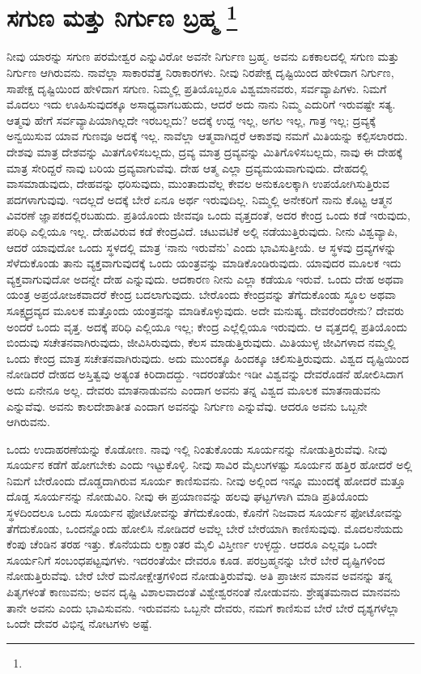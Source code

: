 
\chapter[ಸುಗುಣ ಮತ್ತು ನಿರ್ಗುಣ ಬ್ರಹ್ಮ ]{ಸಗುಣ ಮತ್ತು ನಿರ್ಗುಣ ಬ್ರಹ್ಮ \protect\footnote{}}

ನೀವು ಯಾರನ್ನು ಸಗುಣ ಪರಮೇಶ್ವರ ಎನ್ನುವಿರೋ ಅವನೇ ನಿರ್ಗುಣ ಬ್ರಹ್ಮ. ಅವನು ಏಕಕಾಲದಲ್ಲಿ ಸಗುಣ ಮತ್ತು ನಿರ್ಗುಣ ಆಗಿರುವನು. ನಾವೆಲ್ಲಾ ಸಾಕಾರವೆತ್ತ ನಿರಾಕಾರಗಳು. ನೀವು ನಿರಪೇಕ್ಷ ದೃಷ್ಟಿಯಿಂದ ಹೇಳಿದಾಗ ನಿರ್ಗುಣ, ಸಾಪೇಕ್ಷ ದೃಷ್ಟಿಯಿಂದ ಹೇಳಿದಾಗ ಸಗುಣ. ನಿಮ್ಮಲ್ಲಿ ಪ್ರತಿಯೊಬ್ಬರೂ ವಿಶ್ವಮಾನವರು, ಸರ್ವವ್ಯಾಪಿಗಳು. ನಿಮಗೆ ಮೊದಲು ಇದು ಊಹಿಸುವುದಕ್ಕೂ ಅಸಾಧ್ಯವಾಗಬಹುದು, ಆದರೆ ಅದು ನಾನು ನಿಮ್ಮ ಎದುರಿಗೆ ಇರುವಷ್ಟೇ ಸತ್ಯ. ಆತ್ಮವು ಹೇಗೆ ಸರ್ವವ್ಯಾಪಿಯಾಗಿಲ್ಲದೇ ಇರಬಲ್ಲದು? ಅದಕ್ಕೆ ಉದ್ದ ಇಲ್ಲ, ಅಗಲ ಇಲ್ಲ, ಗಾತ್ರ ಇಲ್ಲ; ದ್ರವ್ಯಕ್ಕೆ ಅನ್ವಯಿಸುವ ಯಾವ ಗುಣವೂ ಅದಕ್ಕೆ ಇಲ್ಲ. ನಾವೆಲ್ಲಾ ಆತ್ಮವಾಗಿದ್ದರೆ ಆಕಾಶವು ನಮಗೆ ಮಿತಿಯನ್ನು ಕಲ್ಪಿಸಲಾರದು. ದೇಶವು ಮಾತ್ರ ದೇಶವನ್ನು ಮಿತಗೊಳಿಸಬಲ್ಲದು, ದ್ರವ್ಯ ಮಾತ್ರ ದ್ರವ್ಯವನ್ನು ಮಿತಿಗೊಳಿಸಬಲ್ಲದು, ನಾವು ಈ ದೇಹಕ್ಕೆ ಮಾತ್ರ ಸೇರಿದ್ದರೆ ನಾವು ಬರಿಯ ದ್ರವ್ಯವಾಗುವೆವು. ದೇಹ ಆತ್ಮ ಎಲ್ಲಾ ದ್ರವ್ಯಮಯವಾಗುವುದು. ದೇಹದಲ್ಲಿ ವಾಸಮಾಡುವುದು, ದೇಹವನ್ನು ಧರಿಸುವುದು, ಮುಂತಾದುವೆಲ್ಲ ಕೇವಲ ಅನುಕೂಲಕ್ಕಾಗಿ ಉಪಯೋಗಿಸುತ್ತಿರುವ ಪದಗಳಾಗುವುವು. ಇದಲ್ಲದೆ ಅದಕ್ಕೆ ಬೇರೆ ಏನೂ ಅರ್ಥ ಇರುವುದಿಲ್ಲ. ನಿಮ್ಮಲ್ಲಿ ಅನೇಕರಿಗೆ ನಾನು ಕೊಟ್ಟ ಆತ್ಮನ ವಿವರಣೆ ಜ್ಞಾಪಕದಲ್ಲಿರಬಹುದು. ಪ್ರತಿಯೊಂದು ಜೀವವೂ ಒಂದು ವೃತ್ತದಂತೆ, ಅದರ ಕೇಂದ್ರ ಒಂದು ಕಡೆ ಇರುವುದು, ಪರಿಧಿ ಎಲ್ಲಿಯೂ ಇಲ್ಲ. ದೇಹವಿರುವ ಕಡೆ ಕೇಂದ್ರವಿದೆ. ಚಟುವಟಿಕೆ ಅಲ್ಲಿ ನಡೆಯುತ್ತಿರುವುದು. ನೀನು ವಿಶ್ವವ್ಯಾಪಿ, ಆದರೆ ಯಾವುದೋ ಒಂದು ಸ್ಥಳದಲ್ಲಿ ಮಾತ್ರ ‘ನಾನು ಇರುವೆನು’ ಎಂದು ಭಾವಿಸುತ್ತೀಯೆ. ಆ ಸ್ಥಳವು ದ್ರವ್ಯಗಳನ್ನು ಸೆಳೆದುಕೊಂಡು ತಾನು ವ್ಯಕ್ತವಾಗುವುದಕ್ಕೆ ಒಂದು ಯಂತ್ರವನ್ನು ಮಾಡಿಕೊಂಡಿರುವುದು. ಯಾವುದರ ಮೂಲಕ ಇದು ವ್ಯಕ್ತವಾಗುವುದೋ ಅದನ್ನೇ ದೇಹ ಎನ್ನುವುದು. ಆದಕಾರಣ ನೀನು ಎಲ್ಲಾ ಕಡೆಯೂ ಇರುವೆ. ಒಂದು ದೇಹ ಅಥವಾ ಯಂತ್ರ ಅಪ್ರಯೋಜಕವಾದರೆ ಕೇಂದ್ರ ಬದಲಾಗುವುದು. ಬೇರೊಂದು ಕೇಂದ್ರವನ್ನು ತೆಗೆದುಕೊಂಡು ಸ್ಥೂಲ ಅಥವಾ ಸೂಕ್ಷ್ಮದ್ರವ್ಯದ ಮೂಲಕ ಮತ್ತೊಂದು ಯಂತ್ರವನ್ನು ಮಾಡಿಕೊಳ್ಳುವುದು. ಅದೇ ಮನುಷ್ಯ. ದೇವರೆಂದರೇನು? ದೇವರು ಅಂದರೆ ಒಂದು ವೃತ್ತ. ಅದಕ್ಕೆ ಪರಿಧಿ ಎಲ್ಲಿಯೂ ಇಲ್ಲ; ಕೇಂದ್ರ ಎಲ್ಲೆಲ್ಲಿಯೂ ಇರುವುದು. ಆ ವೃತ್ತದಲ್ಲಿ ಪ್ರತಿಯೊಂದು ಬಿಂದುವು ಸಚೇತನವಾಗಿರುವುದು, ಜೀವಿಸಿರುವುದು, ಕೆಲಸ ಮಾಡುತ್ತಿರುವುದು. ಮಿತಿಯುಳ್ಳ ಜೀವಿಗಳಾದ ನಮ್ಮಲ್ಲಿ ಒಂದು ಕೇಂದ್ರ ಮಾತ್ರ ಸಚೇತನವಾಗಿರುವುದು. ಅದು ಮುಂದಕ್ಕೂ ಹಿಂದಕ್ಕೂ ಚಲಿಸುತ್ತಿರುವುದು. ವಿಶ್ವದ ದೃಷ್ಟಿಯಿಂದ ನೋಡಿದರೆ ದೇಹದ ಅಸ್ತಿತ್ವವು ಅತ್ಯಂತ ಕಿರಿದಾದದ್ದು. ಇದರಂತೆಯೇ ಇಡೀ ವಿಶ್ವವನ್ನು ದೇವರೊಡನೆ ಹೋಲಿಸಿದಾಗ ಅದು ಏನೇನೂ ಅಲ್ಲ. ದೇವರು ಮಾತನಾಡುವನು ಎಂದಾಗ ಅವನು ತನ್ನ ವಿಶ್ವದ ಮೂಲಕ ಮಾತನಾಡುವನು ಎನ್ನುವೆವು. ಅವನು ಕಾಲದೇಶಾತೀತ ಎಂದಾಗ ಅವನನ್ನು ನಿರ್ಗುಣ ಎನ್ನುವೆವು. ಆದರೂ ಅವನು ಒಬ್ಬನೇ ಆಗಿರುವನು.

ಒಂದು ಉದಾಹರಣೆಯನ್ನು ಕೊಡೋಣ. ನಾವು ಇಲ್ಲಿ ನಿಂತುಕೊಂಡು ಸೂರ್ಯನನ್ನು ನೋಡುತ್ತಿರುವೆವು. ನೀವು ಸೂರ್ಯನ ಕಡೆಗೆ ಹೋಗಬೇಕು ಎಂದು ಇಟ್ಟುಕೊಳ್ಳಿ. ನೀವು ಸಾವಿರ ಮೈಲುಗಳಷ್ಟು ಸೂರ್ಯನ ಹತ್ತಿರ ಹೋದರೆ ಅಲ್ಲಿ ನಿಮಗೆ ಬೇರೊಂದು ದೊಡ್ಡದಾಗಿರುವ ಸೂರ್ಯ ಕಾಣಿಸುವನು. ನೀವು ಅಲ್ಲಿಂದ ಇನ್ನೂ ಮುಂದಕ್ಕೆ ಹೋದರೆ ಮತ್ತೂ ದೊಡ್ಡ ಸೂರ್ಯನನ್ನು ನೋಡುವಿರಿ. ನೀವು ಈ ಪ್ರಯಾಣವನ್ನು ಹಲವು ಘಟ್ಟಗಳಾಗಿ ಮಾಡಿ ಪ್ರತಿಯೊಂದು ಸ್ಥಳದಿಂದಲೂ ಒಂದು ಸೂರ್ಯನ ಫೋಟೋವನ್ನು ತೆಗೆದುಕೊಂಡು, ಕೊನೆಗೆ ನಿಜವಾದ ಸೂರ್ಯನ ಫೋಟೋವನ್ನು ತೆಗೆದುಕೊಂಡು, ಒಂದನ್ನೊಂದು ಹೋಲಿಸಿ ನೋಡಿದರೆ ಅವೆಲ್ಲ ಬೇರೆ ಬೇರೆಯಾಗಿ ಕಾಣಿಸುವುವು. ಮೊದಲನೆಯದು ಕೆಂಪು ಚೆಂಡಿನ ತರಹ ಇತ್ತು. ಕೊನೆಯದು ಲಕ್ಷಾಂತರ ಮೈಲಿ ವಿಸ್ತೀರ್ಣ ಉಳ್ಳದ್ದು. ಆದರೂ ಎಲ್ಲವೂ ಒಂದೇ ಸೂರ್ಯನಿಗೆ ಸಂಬಂಧಪಟ್ಟವುಗಳು. ಇದರಂತೆಯೇ ದೇವರೂ ಕೂಡ. ಪರಬ್ರಹ್ಮನನ್ನು ಬೇರೆ ಬೇರೆ ದೃಷ್ಟಿಗಳಿಂದ ನೋಡುತ್ತಿರುವೆವು. ಬೇರೆ ಬೇರೆ ಮನೋಕ್ಷೇತ್ರಗಳಿಂದ ನೋಡುತ್ತಿರುವೆವು. ಅತಿ ಪ್ರಾಚೀನ ಮಾನವ ಅವನನ್ನು ತನ್ನ ಪಿತೃಗಳಂತೆ ಕಾಣುವನು; ಅವನ ದೃಷ್ಟಿ ವಿಶಾಲವಾದಂತೆ ವಿಶ್ವೇಶ್ವರನಂತೆ ನೋಡುವನು. ಶ್ರೇಷ್ಠತಮನಾದ ಮಾನವನು ತಾನೇ ಅವನು ಎಂದು ಭಾವಿಸುವನು. ಇರುವವನು ಒಬ್ಬನೇ ದೇವರು, ನಮಗೆ ಕಾಣಿಸುವ ಬೇರೆ ಬೇರೆ ದೃಶ್ಯಗಳೆಲ್ಲಾ ಒಂದೇ ದೇವರ ವಿಭಿನ್ನ ನೋಟಗಳು ಅಷ್ಟೆ.

